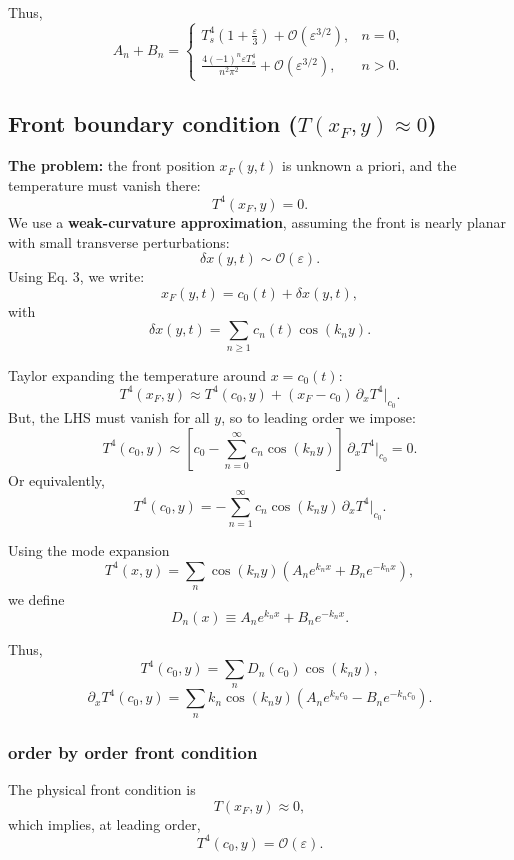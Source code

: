 \documentclass{article}
\begin{document}
Thus,
\[
A_n + B_n =
\begin{cases}
T_s^4\!\left(1+\frac{\varepsilon}{3}\right) + \mathcal{O}(\varepsilon^{3/2}), & n=0,\\[6pt]
\displaystyle \frac{4(-1)^n \varepsilon T_s^4}{n^2\pi^2} + \mathcal{O}(\varepsilon^{3/2}), & n>0.
\end{cases}
\]

\subsection*{Front boundary condition ($T(x_F,y)\approx 0$)}
\textbf{The problem:} the front position $x_F(y,t)$ is unknown a priori, and the temperature must vanish there:
\[
T^4(x_F,y) = 0.
\]
We use a \textbf{weak-curvature approximation}, assuming the front is nearly planar with small transverse perturbations:
\[
\delta x(y,t) \sim \mathcal{O}(\varepsilon).
\] 
Using Eq. 3, we write:
\begin{equation}
x_F(y,t) = c_0(t) + \delta x(y,t),
\end{equation}
with
\begin{equation}
\delta x(y,t) = \sum_{n\ge1} c_n(t)\cos(k_n y).
\end{equation}

Taylor expanding the temperature around $x=c_0(t)$:
\begin{equation}
T^4(x_F,y) \approx T^4(c_0,y) + (x_F-c_0)\,\partial_x T^4|_{c_0}.
\end{equation}
But, the LHS must vanish for all $y$, so to leading order we impose:
\[
T^4(c_0,y) \approx [c_0 - \sum_{n=0}^\infty c_n \cos(k_n y)]\,\partial_x T^4|_{c_0} = 0.
\]
Or equivalently,
\[
T^4(c_0,y) = -\sum_{n=1}^\infty c_n \cos(k_n y)\,\partial_x T^4|_{c_0}.
\]

Using the mode expansion
\[
T^4(x,y) = \sum_n \cos(k_n y)\left(A_n e^{k_n x} + B_n e^{-k_n x}\right),
\]
we define
\[
D_n(x) \equiv A_n e^{k_n x} + B_n e^{-k_n x}.
\]

Thus,
\[
T^4(c_0,y) = \sum_n D_n(c_0)\cos(k_n y),
\]
\[
\partial_x T^4(c_0,y) = \sum_n k_n\cos(k_n y)
\left(A_n e^{k_n c_0} - B_n e^{-k_n c_0}\right).
\]

\subsubsection*{order by order front condition}

The physical front condition is
\[
T(x_F,y) \approx 0,
\]
which implies, at leading order,
\[
T^4(c_0,y) = \mathcal{O}(\varepsilon).
\]
\end{document}
